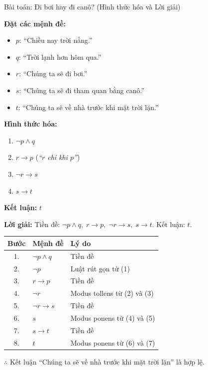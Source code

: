 \documentclass[12pt,a4paper]{article}
\begin{document}
\begin{baitap}{Bài toán: Đi bơi hay đi canô? (Hình thức hóa và Lời giải)}
\noindent
\begin{minipage}[t]{0.55\textwidth}
\textbf{Đặt các mệnh đề:}
\begin{itemize}
  \item $p$: ``Chiều nay trời nắng.''
  \item $q$: ``Trời lạnh hơn hôm qua.''
  \item $r$: ``Chúng ta sẽ đi bơi.''
  \item $s$: ``Chúng ta sẽ đi tham quan bằng canô.''
  \item $t$: ``Chúng ta sẽ về nhà trước khi mặt trời lặn.''
\end{itemize}
\end{minipage}
\hfill
\begin{minipage}[t]{0.42\textwidth}
\textbf{Hình thức hóa:}
\begin{enumerate}
  \item $\neg p \land q$
  \item $r \to p$ (\textit{``$r$ chỉ khi $p$''})
  \item $\neg r \to s$
  \item $s \to t$
\end{enumerate}
\textbf{Kết luận:} $t$
\end{minipage}

\vspace{6pt}
\textbf{Lời giải:} Tiền đề: $\neg p \land q,\; r \to p,\; \neg r \to s,\; s \to t$. Kết luận: $t$.
\vspace{3pt}
\begin{center}
\renewcommand{\arraystretch}{1.2}
\begin{tabular}{cll}
\toprule
\textbf{Bước} & \textbf{Mệnh đề} & \textbf{Lý do} \\
\midrule
1. & $\neg p \land q$ & Tiền đề \\
2. & $\neg p$ & Luật rút gọn từ (1) \\
3. & $r \to p$ & Tiền đề \\
4. & $\neg r$ & Modus tollens từ (2) và (3) \\
5. & $\neg r \to s$ & Tiền đề \\
6. & $s$ & Modus ponens từ (4) và (5) \\
7. & $s \to t$ & Tiền đề \\
8. & \textcolor{AccentRed}{$t$} & Modus ponens từ (6) và (7) \\
\bottomrule
\end{tabular}
\end{center}
\vspace{2pt}
$\therefore$ Kết luận ``Chúng ta sẽ về nhà trước khi mặt trời lặn'' là hợp lệ.
\end{baitap}
\end{document}
